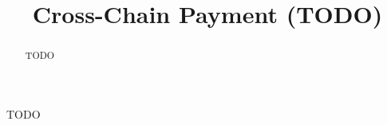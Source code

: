 \documentclass[sigconf, natbib=false]{acmart}
\begin{document}
\title{Cross-Chain Payment (TODO)}

\begin{abstract}
TODO
\end{abstract}


\maketitle





\begin{acks}
TODO
\end{acks}

\printbibliography


\end{document}

